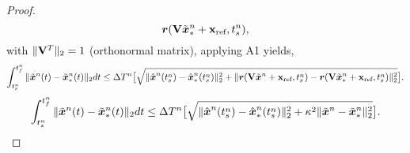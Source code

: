 \begin{proof}
\begin{equation*}
{  \boldsymbol r( \mathbf {V}\tilde{\boldsymbol x}_{*}^{n} + \mathbf{x}_\text{ref}, {t_s^{n}}  )},
\end{equation*}
with $\| \mathbf {V}^T \|_2 = 1$ (orthonormal matrix), applying A1 yields,
\begin{equation*}
\int_{t_s^{n}}^{t_f^{n}} \| \tilde{\boldsymbol x}^{n}(t) - \tilde{\boldsymbol x}_{*}^{n}(t) \|_2 dt 
\le  \Delta T^{n} \big[ \sqrt{ \| \hat{ \boldsymbol x}^{n}(t_s^{n}) - \hat{ \boldsymbol x}_{*}^{n}(t_s^{n} ) \|_2^2 +   \| \boldsymbol r( \mathbf {V} \tilde{\boldsymbol x}^{n} + \mathbf{x}_\text{ref} , {t_s^{n}} ) - 
\boldsymbol r( \mathbf {V} \tilde{\boldsymbol x}_{*}^{n} + \mathbf{x}_\text{ref}, {t_s^{n}}  ) \|_2^2  } \big].
\end{equation*}
\begin{equation*}
\int_{t_s^{n}}^{t_f^{n}} \| \tilde{\boldsymbol x}^{n}(t) - \tilde{\boldsymbol x}_{*}^{n}(t) \|_2 dt 
\le  \Delta T^{n} \big[ \sqrt{ \| \hat{ \boldsymbol x}^{n}(t_s^{n}) - \hat{ \boldsymbol x}_{*}^{n}(t_s^{n} ) \|_2^2 +  \kappa^2 \|  \tilde{\boldsymbol x}^{n} - 
 \tilde{\boldsymbol x}_{*}^{n} \|_2^2  } \big].
\end{equation*}



\end{proof}
